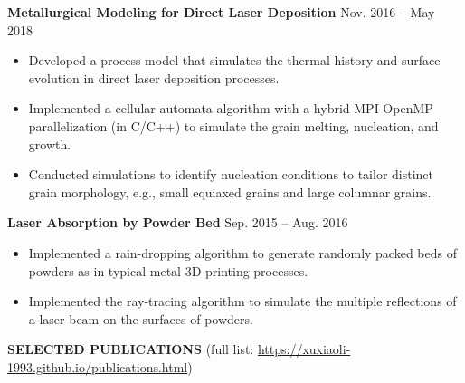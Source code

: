 \documentclass[11pt, letterpaper]{article}
\begin{document}
\vspace{3pt}

\textbf{Metallurgical Modeling for Direct Laser Deposition} \hfill Nov. 2016 -- May 2018
\begin{itemize}[leftmargin=*, labelsep=5mm]
   \item Developed a process model that simulates the thermal history and surface evolution in
      direct laser deposition processes.
   \item Implemented a cellular automata algorithm with a hybrid MPI-OpenMP parallelization (in
      C/C++) to simulate the grain melting, nucleation, and growth. 
   \item Conducted simulations to identify nucleation conditions to tailor distinct grain
      morphology, e.g., small equiaxed grains and large columnar grains.
\end{itemize}

\vspace{3pt}

\textbf{Laser Absorption by Powder Bed} \hfill Sep. 2015 -- Aug. 2016
\begin{itemize}[leftmargin=*, labelsep=5mm]
   \item Implemented a rain-dropping algorithm to generate randomly packed beds of powders as in
      typical metal 3D printing processes.
   \item Implemented the ray-tracing algorithm to simulate the multiple reflections of a laser beam
      on the surfaces of powders.
\end{itemize}

\vspace{9pt}

\textbf{SELECTED PUBLICATIONS} \hfill (full list:  
\href{https://xuxiaoli-1993.github.io/publications.html}
{https://xuxiaoli-1993.github.io/publications.html})

\fullrule
\end{document}
